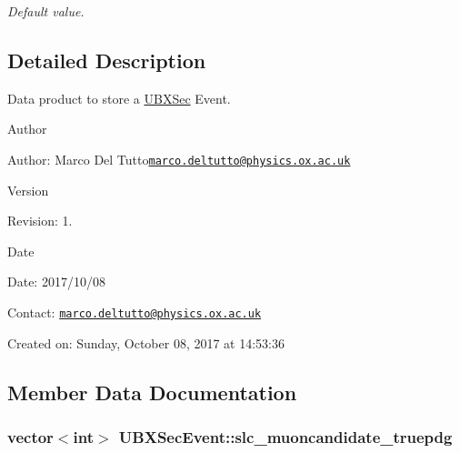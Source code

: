 \begin{DoxyCompactItemize}
\begin{DoxyCompactList}\small\item\em Default value. \end{DoxyCompactList}\end{DoxyCompactItemize}


\subsection{Detailed Description}
Data product to store a \hyperlink{classUBXSec}{U\-B\-X\-Sec} Event. 

\begin{DoxyAuthor}{Author}

\end{DoxyAuthor}
\begin{DoxyParagraph}{Author\-:}
Marco Del Tutto\href{mailto:marco.deltutto@physics.ox.ac.uk}{\tt marco.\-deltutto@physics.\-ox.\-ac.\-uk} 
\end{DoxyParagraph}


\begin{DoxyVersion}{Version}

\end{DoxyVersion}
\begin{DoxyParagraph}{Revision\-:}
1. 
\end{DoxyParagraph}


\begin{DoxyDate}{Date}

\end{DoxyDate}
\begin{DoxyParagraph}{Date\-:}
2017/10/08 
\end{DoxyParagraph}


Contact\-: \href{mailto:marco.deltutto@physics.ox.ac.uk}{\tt marco.\-deltutto@physics.\-ox.\-ac.\-uk}

Created on\-: Sunday, October 08, 2017 at 14\-:53\-:36 

\subsection{Member Data Documentation}
\hypertarget{classUBXSecEvent_a861fa153e7ab975f01780edfaf8f280c}{
\subsubsection[{slc\-\_\-muoncandidate\-\_\-truepdg}]{\setlength{\rightskip}{0pt plus 5cm}vector$<$int$>$ U\-B\-X\-Sec\-Event\-::slc\-\_\-muoncandidate\-\_\-truepdg}}\label{classUBXSecEvent_a861fa153e7ab975f01780edfaf8f280c}


